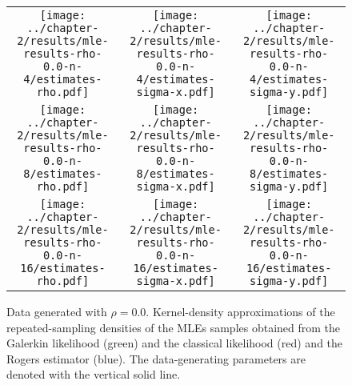 \begin{figure}
  \centering
  \begin{tabular}{ccc}
    \begin{minipage}{0.3\textwidth}
      \centering
      \texttt{[image: ../chapter-2/results/mle-results-rho-0.0-n-4/estimates-rho.pdf]}
    \end{minipage}
    & \begin{minipage}{0.3\textwidth}
      \centering
      \texttt{[image: ../chapter-2/results/mle-results-rho-0.0-n-4/estimates-sigma-x.pdf]}
    \end{minipage}
    & \begin{minipage}{0.3\textwidth}
      \centering
      \texttt{[image: ../chapter-2/results/mle-results-rho-0.0-n-4/estimates-sigma-y.pdf]}
    \end{minipage} \\
    \begin{minipage}{0.3\textwidth}
      \centering
      \texttt{[image: ../chapter-2/results/mle-results-rho-0.0-n-8/estimates-rho.pdf]}
    \end{minipage}
    & \begin{minipage}{0.3\textwidth}
      \centering
      \texttt{[image: ../chapter-2/results/mle-results-rho-0.0-n-8/estimates-sigma-x.pdf]}
    \end{minipage}
    & \begin{minipage}{0.3\textwidth}
      \centering
      \texttt{[image: ../chapter-2/results/mle-results-rho-0.0-n-8/estimates-sigma-y.pdf]}
    \end{minipage} \\
    \begin{minipage}{0.3\textwidth}
      \centering
      \texttt{[image: ../chapter-2/results/mle-results-rho-0.0-n-16/estimates-rho.pdf]}
    \end{minipage}
    & \begin{minipage}{0.3\textwidth}
      \centering
      \texttt{[image: ../chapter-2/results/mle-results-rho-0.0-n-16/estimates-sigma-x.pdf]}
    \end{minipage}
    & \begin{minipage}{0.3\textwidth}
      \centering
      \texttt{[image: ../chapter-2/results/mle-results-rho-0.0-n-16/estimates-sigma-y.pdf]}
    \end{minipage}
  \end{tabular}
  \caption{Data generated with $\rho=0.0$. Kernel-density
    approximations of the repeated-sampling densities of the MLEs
    samples obtained from the Galerkin likelihood (green) and the
    classical likelihood (red) and the Rogers estimator
    (blue). The data-generating parameters are denoted with the
    vertical solid line.}
  \label{fig:mle-comparison-rho-0.0}
\end{figure}